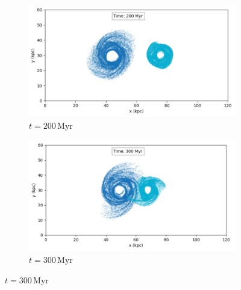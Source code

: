 \begin{figure}[htp]
    \centering
    \begin{subfigure}[b]{0.8\textwidth}
        \centering
        \includegraphics[width=\textwidth]{chapters/results/img/p3m-collision/200myr.png}
        \caption{$t=200\,\text{Myr}$}
        \label{fig:collision-p3m-sub1}
    \end{subfigure}

    \vspace{0.2cm}

    \begin{subfigure}[b]{0.8\textwidth}
        \centering
        \includegraphics[width=\textwidth]{chapters/results/img/p3m-collision/300myr.png}
        \caption{$t=300\,\text{Myr}$}
        \label{fig:collision-p3m-sub2}
    \end{subfigure}

    \vspace{0.2cm}


\end{figure}
